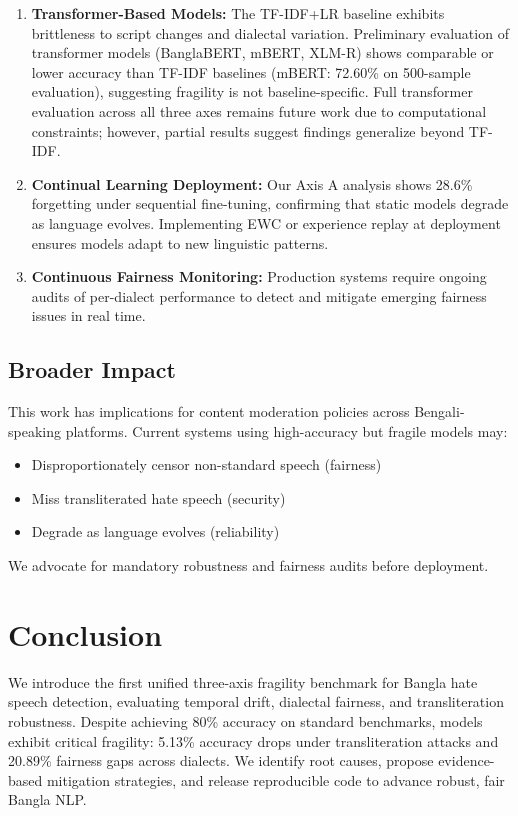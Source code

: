 \documentclass[conference]{IEEEtran}
\begin{document}
\begin{enumerate}
\item \textbf{Transformer-Based Models:} The TF-IDF+LR baseline exhibits brittleness to script changes and dialectal variation. Preliminary evaluation of transformer models (BanglaBERT, mBERT, XLM-R) shows comparable or lower accuracy than TF-IDF baselines (mBERT: 72.60\% on 500-sample evaluation), suggesting fragility is not baseline-specific. Full transformer evaluation across all three axes remains future work due to computational constraints; however, partial results suggest findings generalize beyond TF-IDF.

\item \textbf{Continual Learning Deployment:} Our Axis A analysis shows 28.6\% forgetting under sequential fine-tuning, confirming that static models degrade as language evolves. Implementing EWC or experience replay at deployment ensures models adapt to new linguistic patterns.

\item \textbf{Continuous Fairness Monitoring:} Production systems require ongoing audits of per-dialect performance to detect and mitigate emerging fairness issues in real time.
\end{enumerate}

\subsection{Broader Impact}

This work has implications for content moderation policies across Bengali-speaking platforms. Current systems using high-accuracy but fragile models may:
\begin{itemize}
\item Disproportionately censor non-standard speech (fairness)
\item Miss transliterated hate speech (security)
\item Degrade as language evolves (reliability)
\end{itemize}

We advocate for mandatory robustness and fairness audits before deployment.

\section{Conclusion}

We introduce the first unified three-axis fragility benchmark for Bangla hate speech detection, evaluating temporal drift, dialectal fairness, and transliteration robustness. Despite achieving 80\% accuracy on standard benchmarks, models exhibit critical fragility: 5.13\% accuracy drops under transliteration attacks and 20.89\% fairness gaps across dialects. We identify root causes, propose evidence-based mitigation strategies, and release reproducible code to advance robust, fair Bangla NLP.
\end{document}
